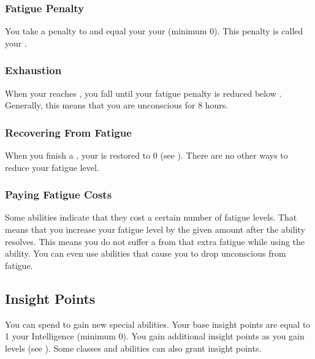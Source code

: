    \subsubsection{Fatigue Penalty}\label{Fatigue Penalty}
      You take a penalty to  and  equal your  \sub your  (minimum 0).
      This penalty is called your .

    \subsubsection{Exhaustion}\label{Exhaustion}
      When your  reaches , you fall \unconscious until your fatigue penalty is reduced below .
      Generally, this means that you are unconscious for 8 hours.

    \subsubsection{Recovering From Fatigue}
      When you finish a , your  is restored to 0 (see ).
      There are no other ways to reduce your fatigue level.

    \subsubsection{Paying Fatigue Costs}
      Some abilities indicate that they cost a certain number of fatigue levels.
      That means that you increase your fatigue level by the given amount after the ability resolves.
      This means you do not suffer a  from that extra fatigue while using the ability.
      You can even use abilities that cause you to drop unconscious from fatigue.

  \subsection{Insight Points}\label{Insight Points}
    You can spend  to gain new special abilities.
    Your base insight points are equal to 1 \add your Intelligence (minimum 0).
    You gain additional insight points as you gain levels (see ).
    Some classes and abilities can also grant insight points.

